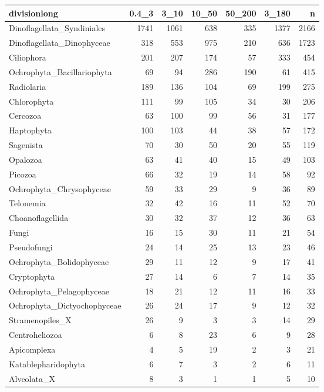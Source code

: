 \begin{table}[ht]
\centering
\begin{tabular}{lrrrrrr}
  \hline
divisionlong & 0.4\_3 & 3\_10 & 10\_50 & 50\_200 & 3\_180 & n \\ 
  \hline
Dinoflagellata\_Syndiniales & 1741 & 1061 & 638 & 335 & 1377 & 2166 \\ 
  Dinoflagellata\_Dinophyceae & 318 & 553 & 975 & 210 & 636 & 1723 \\ 
  Ciliophora & 201 & 207 & 174 & 57 & 333 & 454 \\ 
  Ochrophyta\_Bacillariophyta & 69 & 94 & 286 & 190 & 61 & 415 \\ 
  Radiolaria & 189 & 136 & 104 & 69 & 199 & 275 \\ 
  Chlorophyta & 111 & 99 & 105 & 34 & 30 & 206 \\ 
  Cercozoa & 63 & 100 & 99 & 56 & 31 & 177 \\ 
  Haptophyta & 100 & 103 & 44 & 38 & 57 & 172 \\ 
  Sagenista & 70 & 30 & 50 & 20 & 55 & 119 \\ 
  Opalozoa & 63 & 41 & 40 & 15 & 49 & 103 \\ 
  Picozoa & 66 & 32 & 19 & 14 & 58 & 92 \\ 
  Ochrophyta\_Chrysophyceae & 59 & 33 & 29 & 9 & 36 & 89 \\ 
  Telonemia & 32 & 42 & 16 & 11 & 52 & 70 \\ 
  Choanoflagellida & 30 & 32 & 37 & 12 & 36 & 63 \\ 
  Fungi & 16 & 15 & 30 & 11 & 21 & 54 \\ 
  Pseudofungi & 24 & 14 & 25 & 13 & 23 & 46 \\ 
  Ochrophyta\_Bolidophyceae & 29 & 11 & 12 & 9 & 17 & 41 \\ 
  Cryptophyta & 27 & 14 & 6 & 7 & 14 & 35 \\ 
  Ochrophyta\_Pelagophyceae & 18 & 21 & 12 & 11 & 16 & 33 \\ 
  Ochrophyta\_Dictyochophyceae & 26 & 24 & 17 & 9 & 12 & 32 \\ 
  Stramenopiles\_X & 26 & 9 & 3 & 3 & 14 & 29 \\ 
  Centroheliozoa & 6 & 8 & 23 & 6 & 9 & 28 \\ 
  Apicomplexa & 4 & 5 & 19 & 2 & 3 & 21 \\ 
  Katablepharidophyta & 6 & 7 & 3 & 2 & 6 & 11 \\ 
  Alveolata\_X & 8 & 3 & 1 & 1 & 5 & 10 \\ 

\end{tabular}
\end{table}
